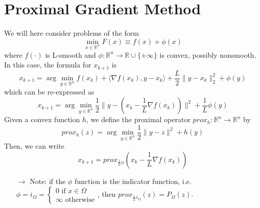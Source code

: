 \documentclass[12pt, openany]{report}
\theoremstyle{definition}
\begin{document}
\section{Proximal Gradient Method}
We will here consider problems of the form 
\begin{equation}
    \min_{x\in \mathbb{R}^n} F(x) \equiv f(x) + \phi(x)
\end{equation}
where \(f(\cdot)\) is L-smooth and \(\phi :\mathbb{R}^n\rightarrow \mathbb{R}\cup \{+\infty\}\) is convex, possibly nonsmooth. \\
In this case, the formula for \(x_{k+1}\) is 
\begin{equation}
    x_{k+1} = \arg\min_{y\in \mathbb{R}^n} f(x_k) + \langle \nabla f(x_k),y-x_k\rangle + \frac{L}{2}\lVert y-x_k\rVert_2^2 + \phi(y)
\end{equation}
which can be re-expressed as 
\begin{equation}
    x_{k+1} = \arg\min_{y\in \mathbb{R}^n} \frac{1}{2}\lVert y-(x_k-\frac{1}{L}\nabla f(x_k))\rVert^2+\frac{1}{L}\phi(y)
\end{equation}
Given a convex function \(h\), we define the proximal operator \(prox_h:\mathbb{R}^n\rightarrow\mathbb{R}^n\) by
\begin{equation}
    prox_h(z) = \arg \min_{y\in \mathbb{R}^n}\frac{1}{2}\lVert y-z\rVert^2+h(y)
\end{equation}
Then, we can write
\begin{equation}
    x_{k+1} = prox_{\frac{1}{L}\phi}\left(x_k-\frac{1}{L}\nabla f(x_k)\right)
\end{equation}
\begin{itemize}
    \item [\(\rightarrow\)] Note: if the \(\phi\) function is the indicator function, i.e. \(\phi=i_\Omega = \begin{cases}
        0 \text{ if } x\in \Omega\\ \infty \text{ otherwise}
    \end{cases}\), then \(prox_{\frac{1}{L}i_\Omega}(z) = P_\Omega(z)\).
\end{itemize}
\end{document}
